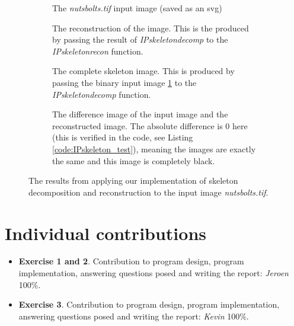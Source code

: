 \documentclass{article}
\begin{document}
\begin{figure}[H]
     \centering
     \begin{subfigure}[t]{0.49\textwidth}
         \centering
         
         \caption{The \textit{nutsbolts.tif} input image (saved as an svg)}
         \label{fig:skeleton_input}
     \end{subfigure}
     \hfill
     \begin{subfigure}[t]{0.49\textwidth}
         \centering
         
         \caption{The reconstruction of the image. This is the produced by passing the result of \textit{IPskeletondecomp} to the \textit{IPskeletonrecon} function.}
         \label{fig:skeleton_reconstruction}
     \end{subfigure}
     \newline
     \begin{subfigure}[t]{0.49\textwidth}
         \centering
         
         \caption{The complete skeleton image. This is produced by passing the binary input image \ref{fig:skeleton_input} to the \textit{IPskeletondecomp} function.}
         \label{fig:skeleton_skeleton}
     \end{subfigure}
     \hfill
     \begin{subfigure}[t]{0.49\textwidth}
         \centering
         
         \caption{The difference image of the input image and the reconstructed image. The absolute difference is 0 here (this is verified in the code, see  Listing \ref{code:IPskeleton_test}), meaning the images are exactly the same and this image is completely black.}
         \label{fig:skeleton_difference}
     \end{subfigure}
    \caption{The results from applying our implementation of skeleton decomposition and reconstruction to the input image \textit{nutsbolts.tif}.}
    \label{fig:skeleton_results}
\end{figure}

\section*{Individual contributions}
\begin{itemize}
    \item \textbf{Exercise 1 and 2}. Contribution to program design, program implementation, answering questions posed and writing the report: \textit{Jeroen} 100\%.
    \item \textbf{Exercise 3}. Contribution to program design, program implementation, answering questions posed and writing the report: \textit{Kevin} 100\%.
\end{itemize}
\end{document}
